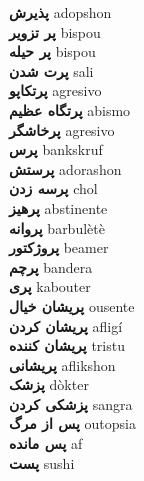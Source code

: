 \textbf{ پذیرش  } adopshon \\
\textbf{ پر تزویر  } bispou \\
\textbf{ پر حیله  } bispou \\
\textbf{ پرت شدن  } sali \\
\textbf{ پرتکاپو  } agresivo \\
\textbf{ پرتگاه عظیم  } abismo \\
\textbf{ پرخاشگر  } agresivo \\
\textbf{ پرس  } bankskruf \\
\textbf{ پرستش  } adorashon \\
\textbf{ پرسه زدن  } chol \\
\textbf{ پرهیز  } abstinente \\
\textbf{ پروانه  } barbulètè \\
\textbf{ پروژکتور  } beamer \\
\textbf{ پرچم  } bandera \\
\textbf{ پری  } kabouter \\
\textbf{ پریشان خیال  } ousente \\
\textbf{ پریشان کردن  } afligí \\
\textbf{ پریشان کننده  } tristu \\
\textbf{ پریشانی  } aflikshon \\
\textbf{ پزشک  } dòkter \\
\textbf{ پزشکی کردن  } sangra \\
\textbf{ پس از مرگ  } outopsia \\
\textbf{ پس مانده  } af \\
\textbf{ پست  } sushi \\
